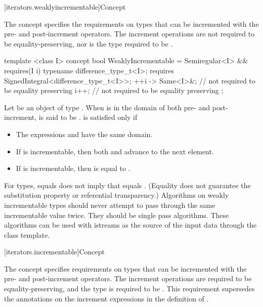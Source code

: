 [iterators.weaklyincrementable]{Concept }

\pnum
The  concept specifies the requirements on
types that can be incremented with the pre- and post-increment operators.
The increment operations are not required to be equality-preserving,
nor is the type required to be .

%
\begin{codeblock}
  template <class I>
  concept bool WeaklyIncrementable =
    Semiregular<I> &&
    requires(I i) {
      typename difference_type_t<I>;
      requires SignedIntegral<difference_type_t<I>>;
      { ++i } -> Same<I>&; // not required to be equality preserving
      i++; // not required to be equality preserving
    };
\end{codeblock}

\pnum
Let  be an object of type . When  is in the domain of
both pre- and post-increment,  is said to be .
 is satisfied only if

\begin{itemize}
\item The expressions  and  have the same domain.
\item If  is incrementable, then both 
  and  advance  to the next element.
\item If  is incrementable, then  is equal to .
\end{itemize}

\pnum
\enternote For  types,  equals  does not imply that 
equals . (Equality does not guarantee the substitution property or referential
transparency.) Algorithms on weakly incrementable types should never attempt to pass
through the same incrementable value twice. They should be single pass algorithms. These algorithms
can be used with istreams as the source of the input data through the  class
template.\exitnote

[iterators.incrementable]{Concept }

\pnum
The  concept specifies requirements on types that can be incremented with the pre-
and post-increment operators. The increment operations are required to be equality-preserving,
and the type is required to be . \enternote This requirement
supersedes the annotations on the increment expressions in the definition of
. \exitnote

